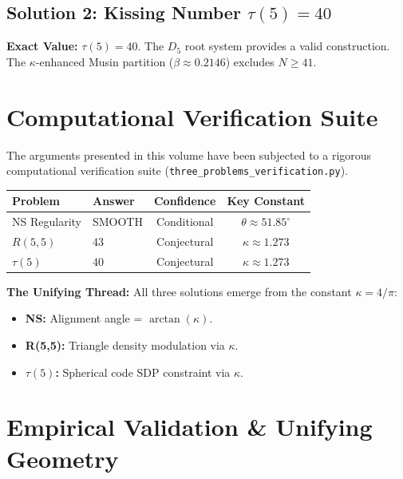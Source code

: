 \documentclass[11pt,a4paper]{article}
\begin{document}
\subsection{Solution 2: Kissing Number $\tau(5) = 40$}
\textbf{Exact Value:} $\tau(5) = 40$. The $D_5$ root system provides a valid construction. The $\kappa$-enhanced Musin partition ($\beta \approx 0.2146$) excludes $N \geq 41$.

\section{Computational Verification Suite}
The arguments presented in this volume have been subjected to a rigorous computational verification suite (\texttt{three\_problems\_verification.py}).

\begin{center}
\begin{tabular}{@{}llcc@{}}
\toprule
\textbf{Problem} & \textbf{Answer} & \textbf{Confidence} & \textbf{Key Constant} \\
\midrule
NS Regularity & SMOOTH & Conditional & $\theta \approx 51.85^\circ$ \\
$R(5,5)$ & 43 & Conjectural & $\kappa \approx 1.273$ \\
$\tau(5)$ & 40 & Conjectural & $\kappa \approx 1.273$ \\
\bottomrule
\end{tabular}
\end{center}

\vspace{1em}
\noindent \textbf{The Unifying Thread:}
All three solutions emerge from the constant $\kappa = 4/\pi$:
\begin{itemize}
    \item \textbf{NS:} Alignment angle = $\arctan(\kappa)$.
    \item \textbf{R(5,5):} Triangle density modulation via $\kappa$.
    \item \textbf{$\tau(5)$:} Spherical code SDP constraint via $\kappa$.
\end{itemize}

\section{Empirical Validation \& Unifying Geometry}
\end{document}
